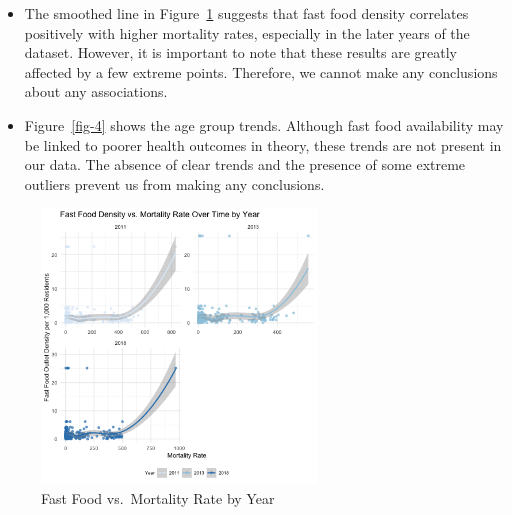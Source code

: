 \documentclass[
  letterpaper,
  DIV=11,
  numbers=noendperiod]{scrartcl}
\begin{document}
\begin{itemize}
\item
  The smoothed line in Figure~\ref{fig-3} suggests that fast food
  density correlates positively with higher mortality rates, especially
  in the later years of the dataset. However, it is important to note
  that these results are greatly affected by a few extreme points.
  Therefore, we cannot make any conclusions about any associations.
\item
  Figure~\ref{fig-4} shows the age group trends. Although fast food
  availability may be linked to poorer health outcomes in theory, these
  trends are not present in our data. The absence of clear trends and
  the presence of some extreme outliers prevent us from making any
  conclusions.
\end{itemize}

\begin{figure}

{\centering \includegraphics[width=0.65\textwidth,height=\textheight]{figures/fastfd_vs_mortality_by_year.png}

}

\caption{\label{fig-3}Fast Food vs.~Mortality Rate by Year}

\end{figure}
\end{document}
